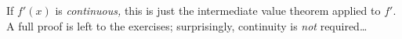 If $f'(x)$ is \emph{continuous,} this is just the intermediate value theorem applied to $f'$. A full proof is left to the exercises; surprisingly, continuity is \emph{not} required\ldots

\goodbreak






% 

